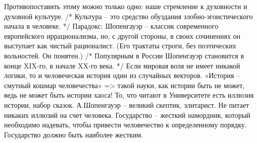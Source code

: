 \documentclass[12pt]{article}
\begin{document}
Противопоставить этому можно только одно: наше стремление к духовности и духовной культуре. 
/* Культура – это средство обуздания злобно-эгоистического начала в человеке. */
Парадокс: Шопенгауэр – классик современного европейского иррационализма, но, с другой стороны, в своих
сочинениях он выступает как чистый рационалист. (Его трактаты строги, без поэтических вольностей. Он
понятен.) /* Популярным в России Шопенгауэр становится в конце XIX-го, в начале XX-го века. */
Если мировая воля не имеет никакой логики, то и человеческая история один из случайных векторов. «История
– смутный кошмар человечества» => такой науки, как истории быть не может, ведь не может быть истории
хаоса! То, что читают в Университете есть иллюзия истории, набор сказок.
А.Шопенгауэр – великий скептик, элитарист. Не питает никаких иллюзий на счет человека. Государство –
жесткий намордник, который необходимо надевать, чтобы привести человечество к определенному порядку.
Государство должно быть наиболее жестким.


\newpage
\end{document}
